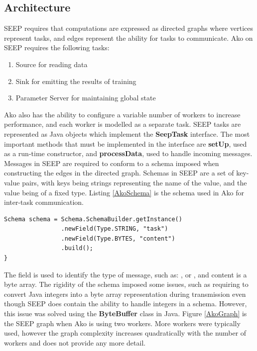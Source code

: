 \documentclass[12pt]{article}
\begin{document}
\subsection{Architecture}
SEEP requires that computations are expressed as directed graphs where vertices represent tasks, and edges represent the ability for tasks to communicate. Ako on SEEP requires the following tasks:

\begin{enumerate}
\item Source for reading data
\item Sink for emitting the results of training
\item Parameter Server for maintaining global state
\end{enumerate}

Ako also has the ability to configure a variable number of workers to increase performance, and each worker is modelled as a separate task.
\newline
\newline
SEEP tasks are represented as Java objects which implement the \textbf{SeepTask} interface. The most important methods that must be implemented in the interface are \textbf{setUp}, used as a run-time constructor, and \textbf{processData}, used to handle incoming messages. Messages in SEEP are required to conform to a schema imposed when constructing the edges in the directed graph. Schemas in SEEP are a set of key-value pairs, with keys being strings representing the name of the value, and the value being of a fixed type. Listing \ref{AkoSchema} is the schema used in Ako for inter-task communication.

\begin{lstlisting}[caption={The SEEP schema used for Ako},label=AkoSchema]
Schema schema = Schema.SchemaBuilder.getInstance()
                .newField(Type.STRING, "task")
                .newField(Type.BYTES, "content")
                .build();
}
\end{lstlisting}

The  field is used to identify the type of message, such as: , or , and content is a byte array. The rigidity of the schema imposed some issues, such as requiring to convert Java integers into a byte array representation during transmission even though SEEP does contain the ability to handle integers in a schema. However, this issue was solved using the \textbf{ByteBuffer} class in Java.
\newline
\newline
Figure \ref{AkoGraph} is the SEEP graph when Ako is using two workers. More workers were typically used, however the graph complexity increases quadratically with the number of workers and does not provide any more detail.
\end{document}
